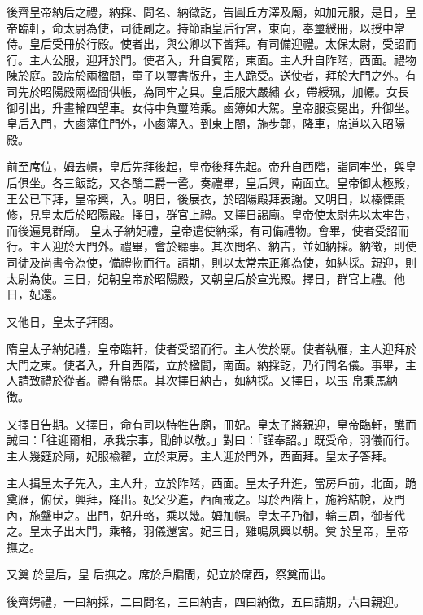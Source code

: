 \begin{pinyinscope}
 後齊皇帝納后之禮，納採、問名、納徵訖，告圓丘方澤及廟，如加元服，是日，皇帝臨軒，命太尉為使，司徒副之。持節詣皇后行宮，東向，奉璽綬冊，以授中常侍。皇后受冊於行殿。使者出，與公卿以下皆拜。有司備迎禮。太保太尉，受詔而行。主人公服，迎拜於門。使者入，升自賓階，東面。主人升自阼階，西面。禮物陳於庭。設席於兩楹間，童子以璽書版升，主人跪受。送使者，拜於大門之外。有司先於昭陽殿兩楹間供帳，為同牢之具。皇后服大嚴繡
 衣，帶綬珮，加幜。女長御引出，升畫輪四望車。女侍中負璽陪乘。鹵簿如大駕。皇帝服袞冕出，升御坐。皇后入門，大鹵簿住門外，小鹵簿入。到東上閤，施步鄣，降車，席道以入昭陽殿。



 前至席位，姆去幜，皇后先拜後起，皇帝後拜先起。帝升自西階，詣同牢坐，與皇后俱坐。各三飯訖，又各酳二爵一巹。奏禮畢，皇后興，南面立。皇帝御太極殿，王公已下拜，皇帝興，入。明日，後展衣，於昭陽殿拜表謝。又明日，以榛慄棗修，見皇太后於昭陽殿。擇日，群官上禮。又擇日謁廟。皇帝使太尉先以太牢告，而後遍見群廟。
 皇太子納妃禮，皇帝遣使納採，有司備禮物。會畢，使者受詔而行。主人迎於大門外。禮畢，會於聽事。其次問名、納吉，並如納採。納徵，則使司徒及尚書令為使，備禮物而行。請期，則以太常宗正卿為使，如納採。親迎，則太尉為使。三日，妃朝皇帝於昭陽殿，又朝皇后於宣光殿。擇日，群官上禮。他日，妃還。



 又他日，皇太子拜閤。



 隋皇太子納妃禮，皇帝臨軒，使者受詔而行。主人俟於廟。使者執雁，主人迎拜於大門之東。使者入，升自西階，立於楹間，南面。納採訖，乃行問名儀。事畢，主人請致禮於從者。禮有幣馬。其次擇日納吉，如納採。又擇日，以玉
 帛乘馬納徵。



 又擇日告期。又擇日，命有司以特牲告廟，冊妃。皇太子將親迎，皇帝臨軒，醮而誡曰：「往迎爾相，承我宗事，勖帥以敬。」對曰：「謹奉詔。」既受命，羽儀而行。主人幾筵於廟，妃服褕翟，立於東房。主人迎於門外，西面拜。皇太子答拜。



 主人揖皇太子先入，主人升，立於阼階，西面。皇太子升進，當房戶前，北面，跪奠雁，俯伏，興拜，降出。妃父少進，西面戒之。母於西階上，施衿結帨，及門內，施鞶申之。出門，妃升輅，乘以幾。姆加幜。皇太子乃御，輪三周，御者代之。皇太子出大門，乘輅，羽儀還宮。妃三日，雞鳴夙興以朝。奠於皇帝，皇帝撫之。



 又奠於皇后，皇
 后撫之。席於戶牖間，妃立於席西，祭奠而出。



 後齊娉禮，一曰納採，二曰問名，三曰納吉，四曰納徵，五曰請期，六曰親迎。




\end{pinyinscope}

